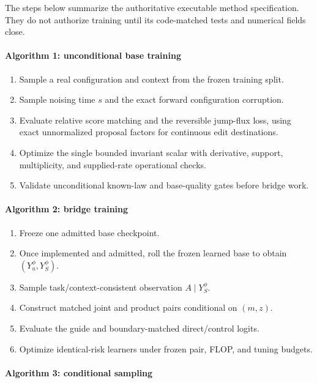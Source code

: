 \documentclass[11pt]{article}
\newcommand{\supportingfile}[2]{%
  \emph{#1} (\nolinkurl{#2})%
}
\def\supportingfile#1#2{#1}%
\begin{document}
The steps below summarize the authoritative \supportingfile{executable method specification}{executable_method_spec.md}. They do not authorize training until its code-matched tests and numerical fields close.

\paragraph{Algorithm 1: unconditional base training}

\begin{enumerate}
\item Sample a real configuration and context from the frozen training split.
\item Sample noising time \(s\) and the exact forward configuration corruption.
\item Evaluate relative score matching and the reversible jump-flux loss, using exact unnormalized proposal factors for continuous edit destinations.
\item Optimize the single bounded invariant scalar with derivative, support, multiplicity, and supplied-rate operational checks.
\item Validate unconditional known-law and base-quality gates before bridge work.
\end{enumerate}

\paragraph{Algorithm 2: bridge training}

\begin{enumerate}
\item Freeze one admitted base checkpoint.
\item Once implemented and admitted, roll the frozen learned base to obtain \((Y_u^\phi,Y_S^\phi)\).
\item Sample task/\allowbreak{}context-consistent observation \(A\mid Y_S^\phi\).
\item Construct matched joint and product pairs conditional on \((m,z)\).
\item Evaluate the guide and boundary-matched direct/\allowbreak{}control logits.
\item Optimize identical-risk learners under frozen pair, FLOP, and tuning budgets.
\end{enumerate}

\paragraph{Algorithm 3: conditional sampling}
\end{document}
